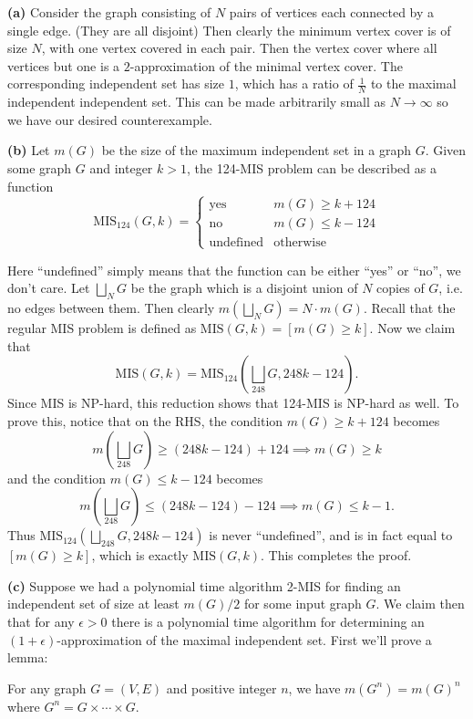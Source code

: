 \documentclass[11pt,letterpaper]{article}
\begin{document}
\begin{solution}
    \textbf{(a)} Consider the graph consisting of $N$ pairs of vertices each connected by a single edge. (They are all disjoint) Then clearly the minimum vertex cover is of size $N$, with one vertex covered in each pair. Then the vertex cover where all vertices but one is a $2$-approximation of the minimal vertex cover. The corresponding independent set has size $1$, which has a ratio of $\frac{1}{N}$ to the maximal independent independent set. This can be made arbitrarily small as $N\to \infty$ so we have our desired counterexample.
    
    \textbf{(b)} Let $m(G)$ be the size of the maximum independent set in a graph $G$. Given some graph $G$ and integer $k>1$, the 124-MIS problem can be described as a function
    \[
        \mathrm{MIS}_{124}(G, k) =\begin{cases}\mathrm{yes}&m(G)\geq k+124\\
            \mathrm{no}&m(G)\leq k-124\\
            \mathrm{undefined}&\mathrm{otherwise}
        \end{cases}
    \] 

    Here ``undefined'' simply means that the function can be either ``yes'' or ``no'', we don't care. Let $\bigsqcup_N G$ be the graph which is a disjoint union of $N$ copies of $G$, i.e. no edges between them. Then clearly $m\left(\bigsqcup_N G\right) = N\cdot m(G)$. Recall that the regular MIS problem is defined as $\textrm{MIS}(G,k)=[m(G)\geq k]$. Now we claim that 
    \[
        \textrm{MIS}(G,k)=\textrm{MIS}_{124}\left(\bigsqcup_{248} G, 248k-124\right)
    .\] 
    Since MIS is NP-hard, this reduction shows that 124-MIS is NP-hard as well. To prove this, notice that on the RHS, the condition $m(G)\geq k+124$ becomes
    \[
        m\left(\bigsqcup_{248}G\right)\geq (248k - 124) + 124 \implies m(G)\geq k
    \]
    and the condition $m(G)\leq k-124$ becomes
    \[
        m\left(\bigsqcup_{248}G\right)\leq (248k - 124) - 124 \implies m(G)\leq k-1
    .\]   
    Thus $\textrm{MIS}_{124}\left(\bigsqcup_{248} G, 248k-124\right)$ is never ``undefined'', and is in fact equal to $[m(G)\geq k]$, which is exactly $\textrm{MIS}(G,k)$. This completes the proof.

    \textbf{(c)} Suppose we had a polynomial time algorithm 2-MIS for finding an independent set of size at least $m(G)/2$ for some input graph $G$. We claim then that for any $\epsilon>0$ there is a polynomial time algorithm for determining an $(1+\epsilon)$-approximation of the maximal independent set. First we'll prove a lemma:
    \begin{ilemma}
        For any graph $G=(V,E)$ and positive integer $n$, we have $m(G^n)=m(G)^n$ where $G^n=G\times \cdots \times G$. 
        

\end{ilemma}
\end{solution}
\end{document}

